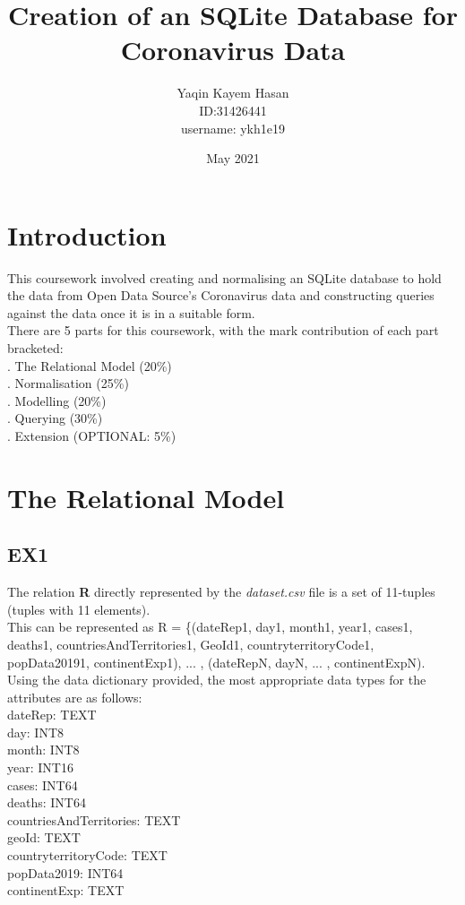 \documentclass{article}
\title{\textbf{Creation of an SQLite Database for Coronavirus Data}}
\author{Yaqin Kayem Hasan \\ ID:31426441 \\ username: ykh1e19}
\date{May 2021}
\begin{document}
\maketitle

\pagebreak
\section{Introduction}
This coursework involved creating and normalising an SQLite database to hold the data from Open Data Source's Coronavirus data and constructing queries against the data once it is in a suitable form. \\

There are 5 parts for this coursework, with the mark contribution of each part bracketed:\\
. The Relational Model (20\%)\\
. Normalisation (25\%)\\
. Modelling (20\%)\\
. Querying (30\%)\\
. Extension (OPTIONAL: 5\%) 

\section{The Relational Model}
\subsection{EX1}
The relation \textbf{R} directly represented by the \textit{dataset.csv} file is a set of 11-tuples (tuples with 11 elements). \\

This can be represented as R = \{(dateRep1, day1, month1, year1, cases1, deaths1, countriesAndTerritories1, GeoId1, countryterritoryCode1, popData20191, continentExp1), ... , (dateRepN, dayN, ... , continentExpN). \\

Using the data dictionary provided, the most appropriate data types for the attributes are as follows: \\
\indent dateRep: TEXT \\
\indent day: INT8 \\
\indent month: INT8 \\
\indent year: INT16 \\ 
\indent cases: INT64 \\
\indent deaths: INT64 \\
\indent countriesAndTerritories: TEXT \\
\indent geoId: TEXT \\
\indent countryterritoryCode: TEXT \\
\indent popData2019: INT64 \\
\indent continentExp: TEXT \\
\end{document}
